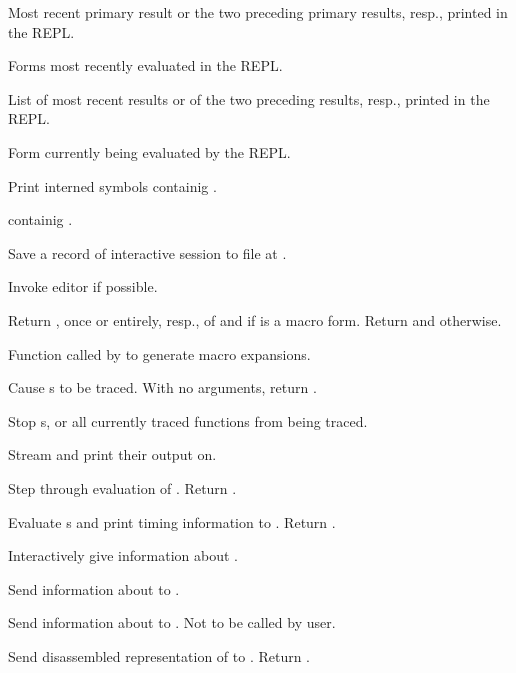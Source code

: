 \begin{LIST}{1cm}
  
  \IT{\Goo{\kwd*{*}\XOR\kwd*{**}\XOR\V*{***}}}
  Most recent primary result or the two preceding primary results,
  resp., printed in the REPL. 
  
  \IT{\Goo{\kwd*{+}\XOR\kwd*{++}\XOR\V*{+++}}}
  Forms most recently evaluated in the REPL.
  
  \IT{\Goo{\kwd*{/}\XOR\kwd*{//}\XOR\V*{///}}}
  List of most recent results or of the two preceding results, resp.,
  printed in the REPL. 
  
  \IT{\kwd*{--}}
  Form currently being evaluated by the REPL.

  Print interned symbols containig .

   containig .

  Save a record of interactive session to file at .

  Invoke editor if possible.

  Return , once or entirely, resp., of
   and \retvalii{\T} if  is a macro form. 
  Return  and \retvalii{\NIL} otherwise.

  Function called by  to generate macro expansions.

  Cause s to be traced. With no arguments,
  return .

  Stop s, or all currently traced functions from being
  traced. 

  Stream  and  print their output on.
  
  Step through evaluation of . Return . 

  Evaluate s and print timing information to
  . Return . 
  
  Interactively give information about .

  Send information about  to .

  Send information about  to . Not to be
  called by user.

  Send disassembled representation of  to
  . Return \retval{\NIL}.

\end{LIST}


